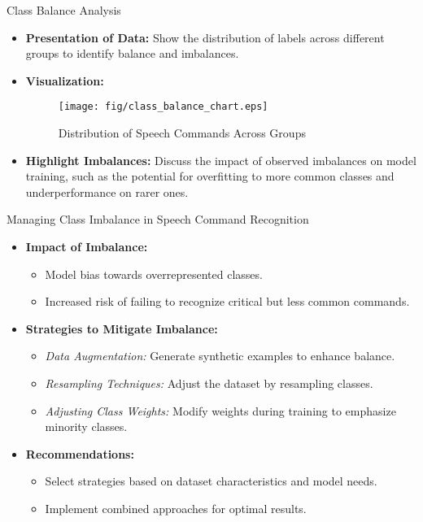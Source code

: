\documentclass{beamer}
\begin{document}
\begin{frame}{Class Balance Analysis}
  \begin{itemize}
    \item \textbf{Presentation of Data:} Show the distribution of labels across different groups to identify balance and imbalances.
    \item \textbf{Visualization:}
      \begin{figure}
        \centering
        \texttt{[image: fig/class\_balance\_chart.eps]} %
        \caption{Distribution of Speech Commands Across Groups}
        \label{fig:class_balance}
      \end{figure}
    \item \textbf{Highlight Imbalances:} Discuss the impact of observed imbalances on model training, such as the potential for overfitting to more common classes and underperformance on rarer ones.
  \end{itemize}
\end{frame}

\begin{frame}{Managing Class Imbalance in Speech Command Recognition}
  \begin{itemize}
    \item \textbf{Impact of Imbalance:}
      \begin{itemize}
        \item Model bias towards overrepresented classes.
        \item Increased risk of failing to recognize critical but less common commands.
      \end{itemize}
    \item \textbf{Strategies to Mitigate Imbalance:}
      \begin{itemize}
        \item \textit{Data Augmentation:} Generate synthetic examples to enhance balance.
        \item \textit{Resampling Techniques:} Adjust the dataset by resampling classes.
        \item \textit{Adjusting Class Weights:} Modify weights during training to emphasize minority classes.
      \end{itemize}
    \item \textbf{Recommendations:}
      \begin{itemize}
        \item Select strategies based on dataset characteristics and model needs.
        \item Implement combined approaches for optimal results.
      \end{itemize}
  \end{itemize}
\end{frame}
\end{document}
